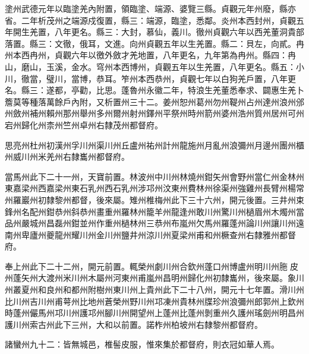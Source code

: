 \begin{pinyinscope}
 塗州武德元年以臨塗羌內附置，領臨塗、端源、婆覽三縣。貞觀元年州廢，縣亦省。二年析茂州之端源戍復置，縣三：端源，臨塗，悉鄰。炎州本西封州，貞觀五年開生羌置，八年更名。縣三：大封，慕仙，義川。徹州貞觀六年以西羌董洞貴部落置。縣三：文徹，俄耳，文進。向州貞觀五年以生羌置。縣二：貝左，向貳。冉州本西冉州，貞觀六年以徼外斂才羌地置，八年更名，九年第為冉州。縣四：冉山，磨山，玉溪，金水。穹州本西博州，貞觀五年以生羌置，八年更名。縣五：小川，徹當，璧川，當博，恭耳。笮州本西恭州，貞觀七年以白狗羌戶置，八年更名。縣三：遂都，亭勸，比思。蓬魯州永徽二年，特浪生羌董悉奉求、闢惠生羌卜簷莫等種落萬餘戶內附，又析置州三十二。姜州恕州葛州勿州鞮州占州達州浪州邠州斂州補州賴州那州舉州多州爾州射州鐸州平祭州時州箭州婆州浩州質州居州可州宕州歸化州柰州竺州卓州右隸茂州都督府。



 思亮州杜州初漢州孚川州渠川州丘盧州祐州計州龍施州月亂州浪彌州月邊州團州櫃州威川州米羌州右隸巂州都督府。



 當馬州此下二十一州，天寶前置。林波州中川州林燒州鉗矢州會野州當仁州金林州東嘉梁州西嘉梁州東石乳州西石乳州涉邛州汶東州費林州徐渠州強雞州長臂州楊常州羅巖州初隸黎州都督，後來屬。雉州椎梅州此下三十六州，開元後置。三井州束鋒州名配州鉗恭州斜恭州畫重州羅林州籠羊州龍逢州敢川州驚川州檛眉州木燭州當品州嚴城州昌磊州鉗並州作重州檛林州三恭州布嵐州欠馬州羅蓬州論川州讓川州遠南州卑廬州夔龍州耀川州金川州鹽井州涼川州夏梁州甫和州橛查州右隸雅州都督府。



 奉上州此下二十二州，開元前置。輒榮州劇川州合欽州蓬口州博盧州明川州胣皮州蓬矢州大渡州米川州木屬州河東州甫嵐州昌明州歸化州初隸巂州，後來屬。象川州叢夏州和良州和都州附樹州東川州上貴州此下二十八州，開元十七年置。滑川州比川州吉川州甫萼州比地州蒼榮州野川州邛凍州貴林州牒珍州浪彌州郎郭州上欽州時蓬州儼馬州邛川州護邛州腳川州開望州上蓬州比蓬州剝重州久護州瑤劍州明昌州護川州索古州此下三州，大和以前置。諾柞州柏坡州右隸黎州都督府。



 諸蠻州九十二：皆無城邑，椎髻皮服，惟來集於都督府，則衣冠如華人焉。




\end{pinyinscope}
